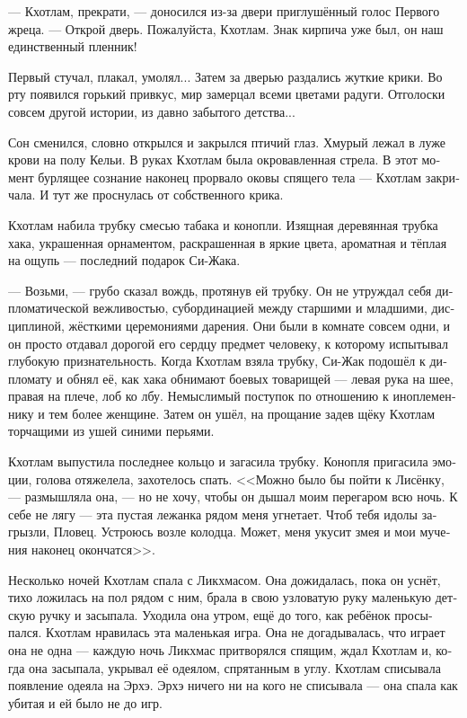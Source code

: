 \documentclass[a4paper,12pt,fleqn]{book}\usepackage{polyglossia}\setdefaultlanguage[babelshorthands=true]{russian}\setotherlanguage{english}\defaultfontfeatures{Ligatures=TeX,Mapping=tex-text}\usepackage{xcolor}\newcommand{\ml}[3]{#2}
\begin{document}
--- Кхотлам, прекрати, --- доносился из-за двери приглушённый голос Первого жреца.
--- Открой дверь.
Пожалуйста, Кхотлам.
Знак кирпича уже был, он наш единственный пленник!

Первый стучал, плакал, умолял...
Затем за дверью раздались жуткие крики.
Во рту появился горький привкус, мир замерцал всеми цветами радуги.
Отголоски совсем другой истории, из давно забытого детства...

Сон сменился, словно открылся и закрылся птичий глаз.
Хмурый лежал в луже крови на полу Кельи.
В руках Кхотлам была окровавленная стрела.
В этот момент бурлящее сознание наконец прорвало оковы спящего тела --- Кхотлам закричала.
И тут же проснулась от собственного крика.

Кхотлам набила трубку смесью табака и конопли.
Изящная деревянная трубка хака, украшенная орнаментом, раскрашенная в яркие цвета, ароматная и тёплая на ощупь --- последний подарок Си-Жака.

--- Возьми, --- грубо сказал вождь, протянув ей трубку.
Он не утруждал себя дипломатической вежливостью, субординацией между старшими и младшими, дисциплиной, жёсткими церемониями дарения.
Они были в комнате совсем одни, и он просто отдавал дорогой его сердцу предмет человеку, к которому испытывал глубокую признательность.
Когда Кхотлам взяла трубку, Си-Жак подошёл к дипломату и обнял её, как хака обнимают боевых товарищей --- левая рука на шее, правая на плече, лоб ко лбу.
Немыслимый поступок по отношению к иноплеменнику и тем более женщине.
Затем он ушёл, на прощание задев щёку Кхотлам торчащими из ушей синими перьями.

Кхотлам выпустила последнее кольцо и загасила трубку.
Конопля пригасила эмоции, голова отяжелела, захотелось спать.
<<Можно было бы пойти к Лисёнку, --- размышляла она, --- но не хочу, чтобы он дышал моим перегаром всю ночь.
К себе не лягу --- эта пустая лежанка рядом меня угнетает.
Чтоб тебя идолы загрызли, Пловец.
Устроюсь возле колодца.
Может, меня укусит змея и мои мучения наконец окончатся>>.

Несколько ночей Кхотлам спала с Ликхмасом.
Она дожидалась, пока он уснёт, тихо ложилась на пол рядом с ним, брала в свою узловатую руку маленькую детскую ручку и засыпала.
Уходила она утром, ещё до того, как ребёнок просыпался.
Кхотлам нравилась эта маленькая игра.
Она не догадывалась, что играет она не одна --- каждую ночь Ликхмас притворялся спящим, ждал Кхотлам и, когда она засыпала, укрывал её одеялом, спрятанным в углу.
Кхотлам списывала появление одеяла на Эрхэ.
Эрхэ ничего ни на кого не списывала --- она спала как убитая и ей было не до игр.
\end{document}
